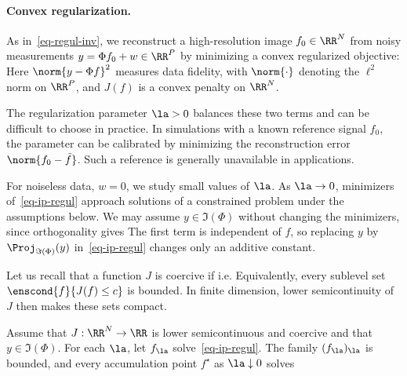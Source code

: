 \paragraph{Convex regularization.}

As in~\eqref{eq-regul-inv}, we reconstruct a high-resolution image $f_0 \in \RR^N$ from noisy measurements $y = \Phi f_0 + w \in \RR^P$ by minimizing a convex regularized objective:
Here $\norm{y-\Phi f}^2$ measures data fidelity, with $\norm{\cdot}$ denoting the $\ell^2$ norm on $\RR^P$, and $J(f)$ is a convex penalty on $\RR^N$.

The regularization parameter $\la>0$ balances these two terms and can be difficult to choose in practice.
In simulations with a known reference signal $f_0$, the parameter can be calibrated by minimizing the reconstruction error $\norm{f_0-\tilde f}$. Such a reference is generally unavailable in applications.


For noiseless data, $w = 0$, we study small values of $\la$. As $\la \rightarrow 0$, minimizers of~\eqref{eq-ip-regul} approach solutions of a constrained problem under the assumptions below.
%
We may assume $y \in \Im(\Phi)$ without changing the minimizers, since orthogonality gives
The first term is independent of $f$, so replacing $y$ by $\Proj_{\Im(\Phi)}(y)$ in~\eqref{eq-ip-regul} changes only an additive constant.

Let us recall that a function $J$ is coercive if
i.e.
Equivalently, every sublevel set $\enscond{f}{J(f) \leq c}$ is bounded. In finite dimension, lower semicontinuity of $J$ then makes these sets compact.

\begin{prop}\label{prop-gamma-conv-regul}
Assume that $J:\RR^N\to\RR$ is lower semicontinuous and coercive and that $y\in\Im(\Phi)$. For each $\la$, let $f_\la$ solve~\eqref{eq-ip-regul}. The family $(f_\la)_\la$ is bounded, and every accumulation point $f^\star$ as $\la\downarrow0$ solves
\end{prop}

